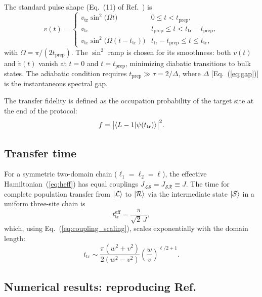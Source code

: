 \documentclass[
  reprint,
  amsmath,
  amssymb,
  aps,
  prb,
  floatfix,
  longbibliography,
]{revtex4-2}
\newcommand{\ttr}{t_{\mathrm{tr}}}
\newcommand{\tprep}{t_{\mathrm{prep}}}
\newcommand{\JLS}{J_{\mathcal{LS}}}
\newcommand{\JSR}{J_{\mathcal{SR}}}
\newcommand{\ketL}{\ket{\mathcal{L}}}
\newcommand{\ketS}{\ket{\mathcal{S}}}
\newcommand{\ketR}{\ket{\mathcal{R}}}
\begin{document}
The standard pulse shape (Eq.~(11) of Ref.~\cite{Zurita2023}) is
\begin{equation}
  v(t) =
  \begin{cases}
    v_{\mathrm{tr}} \sin^2\!\bigl(\Omega t\bigr) & 0 \leq t < \tprep, \\
    v_{\mathrm{tr}} & \tprep \leq t < \ttr - \tprep, \\
    v_{\mathrm{tr}} \sin^2\!\bigl(\Omega(t - \ttr)\bigr) & \ttr - \tprep \leq t \leq \ttr,
  \end{cases}
  \label{eq:pulse}
\end{equation}
with $\Omega = \pi/(2\tprep)$. The $\sin^2$ ramp is chosen for its smoothness:
both $v(t)$ and $\dot{v}(t)$ vanish at $t = 0$ and $t = \tprep$, minimizing
diabatic transitions to bulk states. The adiabatic condition requires
$\tprep \gg \tau = 2/\Delta$, where $\Delta$ [Eq.~(\ref{eq:gap})] is the instantaneous spectral gap.

The transfer fidelity is defined as the occupation probability of the target
site at the end of the protocol:
\begin{equation}
  f = \bigl|\braket{L-1|\psi(\ttr)}\bigr|^2.
  \label{eq:fidelity}
\end{equation}

\subsection{Transfer time}
\label{sec:transfer_time}

For a symmetric two-domain chain ($\ell_1 = \ell_2 = \ell$), the effective
Hamiltonian~(\ref{eq:heff}) has equal couplings $\JLS = \JSR \equiv J$.
The time for complete population transfer from $\ketL$ to $\ketR$ via the
intermediate state $\ketS$ in a uniform three-site chain is
\begin{equation}
  \ttr^{\mathrm{eff}} = \frac{\pi}{\sqrt{2}\, J},
  \label{eq:ttr_sym}
\end{equation}
which, using Eq.~(\ref{eq:coupling_scaling}), scales exponentially with the
domain length:
\begin{equation}
  \ttr \sim \frac{\pi(w^2 + v^2)}{2(w^2 - v^2)}
  \left(\frac{w}{v}\right)^{\!\ell/2 + 1}.
  \label{eq:ttr_analytical}
\end{equation}

\subsection{Numerical results: reproducing Ref.~\cite{Zurita2023}}
\label{sec:results_symmetric}
\end{document}
